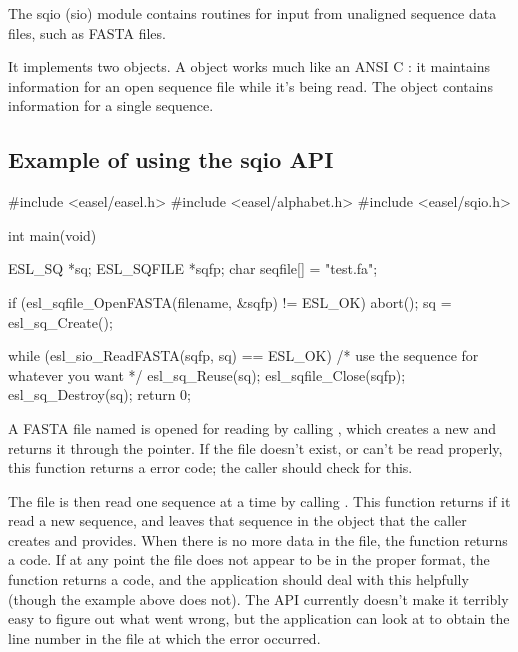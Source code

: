 
The sqio (sio) module contains routines for input from unaligned
sequence data files, such as FASTA files.

It implements two objects. A  object works much
like an ANSI C : it maintains information for an open
sequence file while it's being read. The  object
contains information for a single sequence.

\subsection{Example of using the sqio API}

\begin{cchunk}
#include <easel/easel.h>
#include <easel/alphabet.h>
#include <easel/sqio.h>

int
main(void)
{
  ESL_SQ     *sq;
  ESL_SQFILE *sqfp;
  char        seqfile[] = "test.fa";

  if (esl_sqfile_OpenFASTA(filename, &sqfp) != ESL_OK) abort();
  sq = esl_sq_Create();

  while (esl_sio_ReadFASTA(sqfp, sq) == ESL_OK)
  {
    /* use the sequence for whatever you want */
    esl_sq_Reuse(sq);
  }
  esl_sqfile_Close(sqfp);
  esl_sq_Destroy(sq);
  return 0;
}
\end{cchunk}


A FASTA file named  is opened for reading by calling
, which creates a new
 and returns it through the  pointer.
If the file doesn't exist, or can't be read properly, this function
returns a  error code; the caller should check for
this.

The file is then read one sequence at a time by calling
. This function returns
 if it read a new sequence, and leaves that sequence in
the  object that the caller creates and provides.  When
there is no more data in the file, the  function
returns a  code. If at any point the file does not
appear to be in the proper format, the  function
returns a  code, and the application should deal
with this helpfully (though the example above does not). The API
currently doesn't make it terribly easy to figure out what went wrong,
but the application can look at  to obtain the
line number in the file at which the error occurred.


